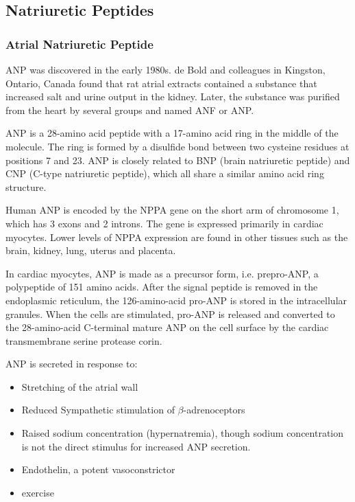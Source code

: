 \documentclass[14pt,a4paper,onecolumn]{article}
\begin{document}
\subsection{Natriuretic Peptides}


\subsubsection{Atrial Natriuretic Peptide}
ANP was discovered in the early 1980s. de Bold and colleagues in Kingston, Ontario, Canada found that rat atrial extracts contained a substance that increased salt and urine output in the kidney.\citep{deBoldetal1981} Later, the substance was purified from the heart by several groups and named ANF or ANP.\citep{deBold1985}

ANP is a 28-amino acid peptide with a 17-amino acid ring in the middle of the molecule. The ring is formed by a disulfide bond between two cysteine residues at positions 7 and 23. ANP is closely related to BNP (brain natriuretic peptide) and CNP (C-type natriuretic peptide), which all share a similar amino acid ring structure.

Human ANP is encoded by the NPPA gene on the short arm of chromosome 1, which has 3 exons and 2 introns. The gene is expressed primarily in cardiac myocytes. Lower levels of NPPA expression are found in other tissues such as the brain, kidney, lung, uterus and placenta.

In cardiac myocytes, ANP is made as a precursor form, i.e. prepro-ANP, a polypeptide of 151 amino acids. After the signal peptide is removed in the endoplasmic reticulum, the 126-amino-acid pro-ANP is stored in the intracellular granules. When the cells are stimulated, pro-ANP is released and converted to the 28-amino-acid C-terminal mature ANP on the cell surface by the cardiac transmembrane serine protease corin.\citep{Yanetal1999}\citep{Yanetal2000}

ANP is secreted in response to:
\begin{itemize}
    \item Stretching of the atrial wall \citep{Widmaieretal2008}
    \item Reduced Sympathetic stimulation of $\beta$-adrenoceptors
    \item Raised sodium concentration (hypernatremia), though sodium concentration is not the direct stimulus for increased ANP secretion. \citep{Widmaieretal2008}
    \item Endothelin, a potent vasoconstrictor
    \item exercise \citep{Kokkonenetal2002}
\end{itemize}
\end{document}
